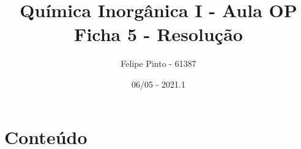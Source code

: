 \documentclass[12pt]{article}
\begin{document}
\title{\bfseries\color{DarkGreen!75!}%
	Química Inorgânica I - Aula OP\\
	Ficha 5 - Resolução%
}
\author{Felipe Pinto - 61387}
\date{06/05 - 2021.1}


\maketitle

\section*{Conteúdo}
\renewcommand{\contentsname}{}

\begin{multicols}{2} \tableofcontents \end{multicols}

\restoregeometry



\setcounter{section}{18}
\section{}


\subsubsection{}


\subsubsection{}


\subsubsection{}



\section{}
\end{document}
